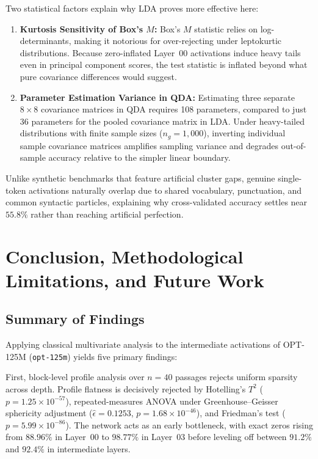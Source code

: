 \documentclass[12pt, a4paper, oneside]{report}
\theoremstyle{definition}
\begin{document}
Two statistical factors explain why LDA proves more effective here:
\begin{enumerate}
    \item \textbf{Kurtosis Sensitivity of Box's $M$:} Box's $M$ statistic relies on log-determinants, making it notorious for over-rejecting under leptokurtic distributions. Because zero-inflated Layer~00 activations induce heavy tails even in principal component scores, the test statistic is inflated beyond what pure covariance differences would suggest.
    \item \textbf{Parameter Estimation Variance in QDA:} Estimating three separate $8 \times 8$ covariance matrices in QDA requires 108 parameters, compared to just 36 parameters for the pooled covariance matrix in LDA. Under heavy-tailed distributions with finite sample sizes ($n_g = 1{,}000$), inverting individual sample covariance matrices amplifies sampling variance and degrades out-of-sample accuracy relative to the simpler linear boundary.
\end{enumerate}

Unlike synthetic benchmarks that feature artificial cluster gaps, genuine single-token activations naturally overlap due to shared vocabulary, punctuation, and common syntactic particles, explaining why cross-validated accuracy settles near $55.8\%$ rather than reaching artificial perfection.

\chapter{Conclusion, Methodological Limitations, and Future Work}

\section{Summary of Findings}

Applying classical multivariate analysis to the intermediate activations of OPT-125M (\texttt{opt-125m}) yields five primary findings:

First, block-level profile analysis over $n = 40$ passages rejects uniform sparsity across depth. Profile flatness is decisively rejected by Hotelling's $T^2$ ($p = 1.25 \times 10^{-57}$), repeated-measures ANOVA under Greenhouse--Geisser sphericity adjustment ($\hat{\epsilon} = 0.1253$, $p = 1.68 \times 10^{-46}$), and Friedman's test ($p = 5.99 \times 10^{-86}$). The network acts as an early bottleneck, with exact zeros rising from $88.96\%$ in Layer~00 to $98.77\%$ in Layer~03 before leveling off between $91.2\%$ and $92.4\%$ in intermediate layers.
\end{document}
